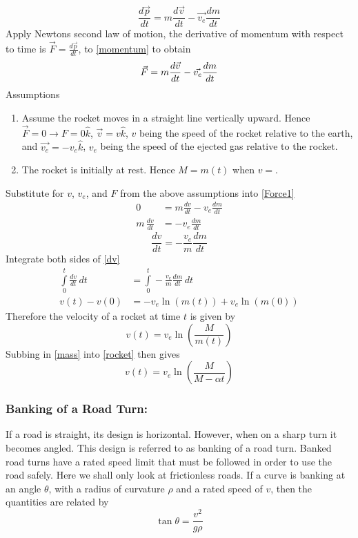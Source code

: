 \documentclass[14pt]{article}
\begin{document}
    \begin{equation}\label{momentum}
        \frac{d\vec p}{d t}=m \frac{d\vec v}{d t}-\vec{v_e}\frac{d m}{d t}
    \end{equation}
    Apply Newtons second law of motion, the derivative of momentum with
    respect to time is $\vec F=\frac{d\vec p}{dt}$, to \eqref{momentum}
    to obtain
    \begin{equation}\label{Force1}
        \vec F=m \frac{d\vec v}{d t}-\vec{v_e}\frac{d m}{d t}\\
    \end{equation}
    Assumptions
    \begin{enumerate}
        \item Assume the rocket moves in a straight line vertically
        upward. Hence $\vec F=0\rightarrow F=0\hat k$, $\vec v=v\hat k$,
        $v$ being the speed of the rocket relative to the earth, and
        $\vec{v_e}=-v_e\hat k$, $v_e$ being the speed of the ejected gas
        relative to the rocket.
        \item The rocket is initially at rest. Hence $M=m(t)$ when $v=$.
    \end{enumerate}
    Substitute for $v$, $v_e$, and $F$ from the above assumptions into
    \eqref{Force1}
    \begin{align*}
        0&=m\frac{dv}{dt}-v_e\frac{dm}{dt}\\
        m\, \frac{dv}{dt}&=-v_e\frac{dm}{dt}   
    \end{align*}
    \begin{equation}\label{dv}
        \frac{dv}{dt}=-\frac{v_e} {m}\frac{dm}{dt}
    \end{equation}
    Integrate both sides of \eqref{dv}
    \begin{align*}
        \int\limits_0^t \frac{dv}{dt}\, dt&=\int\limits_0^t -\frac{v_e} {m}\frac{dm}{dt}\, dt\\
        v(t)-v(0)&=-v_e\ln(m(t))+v_e\ln(m(0))
    \end{align*}
    Therefore the velocity of a rocket at time $t$ is given by
    \begin{equation}\label{rocket}
        v(t)=v_e\ln\left(\frac{M}{m(t)}\right)
    \end{equation}
    Subbing in \eqref{mass} into \eqref{rocket} then gives
    $$v(t)=v_e\ln\left(\frac{M}{M-\alpha t}\right)$$
    
    \subsubsection{Banking of a Road Turn:}
    If a road is straight, its design is horizontal. However, when on a
    sharp turn it becomes angled. This design is referred to as banking
    of a road turn. Banked road turns have a rated speed limit that must
    be followed in order to use the road safely. Here we shall only look
    at frictionless roads. If a curve is banking at an angle $\theta$,
    with a radius of curvature $\rho$ and a rated speed of $v$, then the
    quantities are related by
    $$\tan \theta=\frac{v^2}{g\rho}$$ 
    \pagebreak
\end{document}
